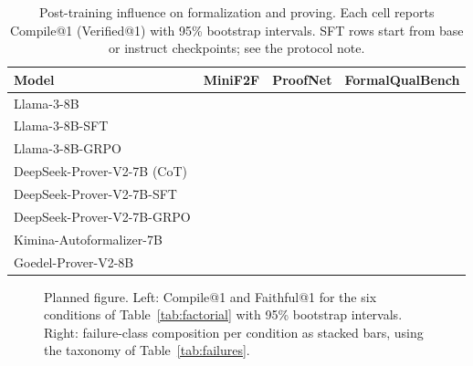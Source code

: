\documentclass[sigconf,anonymous]{aamas}
\begin{document}
\begin{table}[h!]
    \centering
    \small
    \caption{Post-training influence on formalization and proving. Each cell
    reports Compile@1 (Verified@1) with 95\% bootstrap intervals. SFT rows start
    from base or instruct checkpoints; see the protocol note.}
    \begin{tabular}{l c c c}
        \toprule
        Model & MiniF2F & ProofNet & FormalQualBench \\
        \midrule
         Llama-3-8B & & & \\
         Llama-3-8B-SFT & & & \\
         Llama-3-8B-GRPO & & & \\
         DeepSeek-Prover-V2-7B (CoT) & & & \\
         DeepSeek-Prover-V2-7B-SFT & & & \\
         DeepSeek-Prover-V2-7B-GRPO & & & \\
         Kimina-Autoformalizer-7B & & & \\
         Goedel-Prover-V2-8B & & & \\
        \bottomrule
    \end{tabular}
    \label{tab:main}
\end{table}
\begin{figure}[h!]
    \centering
    \fbox{\rule{0pt}{4cm}\rule{0.45\linewidth}{0pt}}\hfill
    \fbox{\rule{0pt}{4cm}\rule{0.45\linewidth}{0pt}}
    \caption{Planned figure. Left: Compile@1 and Faithful@1 for the six
    conditions of Table~\ref{tab:factorial} with 95\% bootstrap intervals.
    Right: failure-class composition per condition as stacked bars, using the
    taxonomy of Table~\ref{tab:failures}.}
    \label{fig:factorial}
\end{figure}



\end{document}
